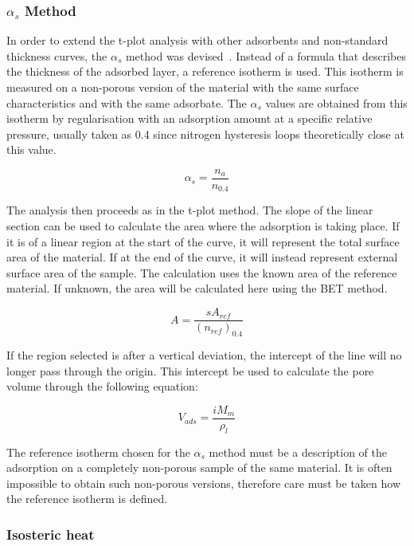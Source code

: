 \subsubsection{\(\alpha_s\) Method}

In order to extend the t-plot analysis with other adsorbents and non-standard
thickness curves, the \(\alpha_s\) method was 
devised~\cite{atkinsonAdsorptivePropertiesMicroporous1984}.
Instead of a formula that describes the thickness of the adsorbed layer, 
a reference isotherm is used. This isotherm is measured on a non-porous 
version of the material with the same surface characteristics and with 
the same adsorbate.
The \(\alpha_s\) values are obtained from this isotherm by regularisation with
an adsorption amount at a specific relative pressure, usually taken as 0.4 since
nitrogen hysteresis loops theoretically close at this value.

\begin{equation}
	\alpha_s = \frac{n_a}{n_{0.4}}
\end{equation}

The analysis then proceeds as in the t-plot method. 
The slope of the linear section can be used to calculate the area
where the adsorption is taking place. If it is of a linear region
at the start of the curve, it will represent the total surface area
of the material. If at the end of the curve, it will instead
represent external surface area of the sample.
The calculation uses the known area of the reference material.
If unknown, the area will be calculated here using the BET method.

\begin{equation}
	A = \frac{s A_{ref}}{(n_{ref})_{0.4}}
\end{equation}


If the region selected is after a vertical deviation, the intercept of the line
will no longer pass through the origin. This intercept be used to calculate the
pore volume through the following equation:

\begin{equation}
	V_{ads} = \frac{i M_m}{\rho_{l}}
\end{equation}


The reference isotherm chosen for the \(\alpha_s\) method must be a description
of the adsorption on a completely non-porous sample of the same material. It is
often impossible to obtain such non-porous versions, therefore care must be 
taken how the reference isotherm is defined.


\subsubsection{Isosteric heat}

